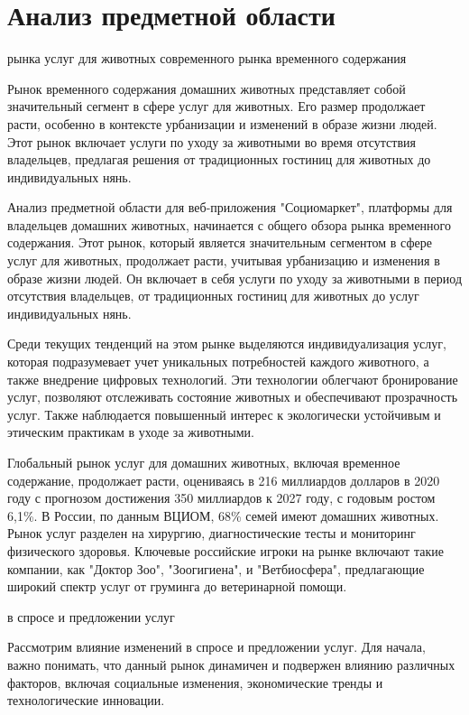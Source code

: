 \section{Анализ предметной области}
 рынка услуг для животных
 современного рынка временного содержания

Рынок временного содержания домашних животных представляет собой значительный сегмент в сфере услуг для животных. Его размер продолжает расти, особенно в контексте урбанизации и изменений в образе жизни людей. Этот рынок включает услуги по уходу за животными во время отсутствия владельцев, предлагая решения от традиционных гостиниц для животных до индивидуальных нянь.

Анализ предметной области для веб-приложения "Социомаркет", платформы для владельцев домашних животных, начинается с общего обзора рынка временного содержания. Этот рынок, который является значительным сегментом в сфере услуг для животных, продолжает расти, учитывая урбанизацию и изменения в образе жизни людей. Он включает в себя услуги по уходу за животными в период отсутствия владельцев, от традиционных гостиниц для животных до услуг индивидуальных нянь.

Среди текущих тенденций на этом рынке выделяются индивидуализация услуг, которая подразумевает учет уникальных потребностей каждого животного, а также внедрение цифровых технологий. Эти технологии облегчают бронирование услуг, позволяют отслеживать состояние животных и обеспечивают прозрачность услуг. Также наблюдается повышенный интерес к экологически устойчивым и этическим практикам в уходе за животными.

Глобальный рынок услуг для домашних животных, включая временное содержание, продолжает расти, оцениваясь в 216 миллиардов долларов в 2020 году с прогнозом достижения 350 миллиардов к 2027 году, с годовым ростом 6,1\%​​. В России, по данным ВЦИОМ, 68\% семей имеют домашних животных. Рынок услуг разделен на хирургию, диагностические тесты и мониторинг физического здоровья​​. Ключевые российские игроки на рынке включают такие компании, как "Доктор Зоо", "Зоогигиена", и "Ветбиосфера", предлагающие широкий спектр услуг от груминга до ветеринарной помощи.

 в спросе и предложении услуг

Рассмотрим влияние изменений в спросе и предложении услуг. Для начала, важно понимать, что данный рынок динамичен и подвержен влиянию различных факторов, включая социальные изменения, экономические тренды и технологические инновации.

